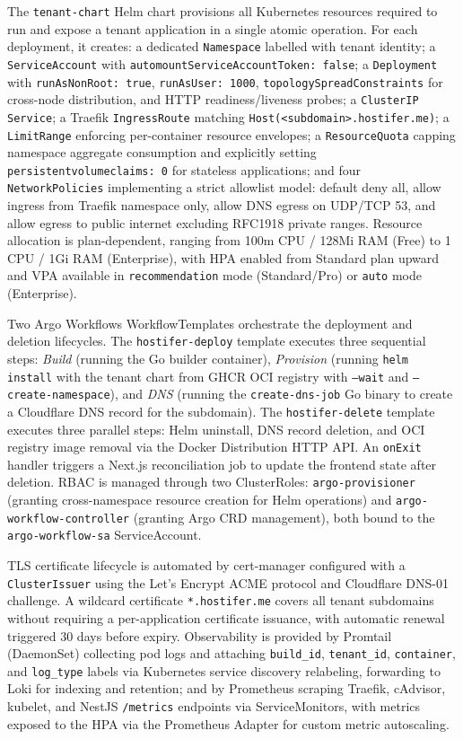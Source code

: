 The \texttt{tenant-chart} Helm chart provisions all Kubernetes resources required to run and expose a tenant application in a single atomic operation. For each deployment, it creates: a dedicated \texttt{Namespace} labelled with tenant identity; a \texttt{ServiceAccount} with \texttt{automountServiceAccountToken: false}; a \texttt{Deployment} with \texttt{runAsNonRoot: true}, \texttt{runAsUser: 1000}, \texttt{topologySpreadConstraints} for cross-node distribution, and HTTP readiness/liveness probes; a \texttt{ClusterIP Service}; a Traefik \texttt{IngressRoute} matching \texttt{Host(<subdomain>.hostifer.me)}; a \texttt{LimitRange} enforcing per-container resource envelopes; a \texttt{ResourceQuota} capping namespace aggregate consumption and explicitly setting \texttt{persistentvolumeclaims: 0} for stateless applications; and four \texttt{NetworkPolicies} implementing a strict allowlist model: default deny all, allow ingress from Traefik namespace only, allow DNS egress on UDP/TCP 53, and allow egress to public internet excluding RFC1918 private ranges. Resource allocation is plan-dependent, ranging from 100m CPU / 128Mi RAM (Free) to 1 CPU / 1Gi RAM (Enterprise), with HPA enabled from Standard plan upward and VPA available in \texttt{recommendation} mode (Standard/Pro) or \texttt{auto} mode (Enterprise).

Two Argo Workflows WorkflowTemplates orchestrate the deployment and deletion lifecycles. The \texttt{hostifer-deploy} template executes three sequential steps: \textit{Build} (running the Go builder container), \textit{Provision} (running \texttt{helm install} with the tenant chart from GHCR OCI registry with \texttt{--wait} and \texttt{--create-namespace}), and \textit{DNS} (running the \texttt{create-dns-job} Go binary to create a Cloudflare DNS record for the subdomain). The \texttt{hostifer-delete} template executes three parallel steps: Helm uninstall, DNS record deletion, and OCI registry image removal via the Docker Distribution HTTP API. An \texttt{onExit} handler triggers a Next.js reconciliation job to update the frontend state after deletion. RBAC is managed through two ClusterRoles: \texttt{argo-provisioner} (granting cross-namespace resource creation for Helm operations) and \texttt{argo-workflow-controller} (granting Argo CRD management), both bound to the \texttt{argo-workflow-sa} ServiceAccount.

TLS certificate lifecycle is automated by cert-manager configured with a \texttt{ClusterIssuer} using the Let's Encrypt ACME protocol and Cloudflare DNS-01 challenge. A wildcard certificate \texttt{*.hostifer.me} covers all tenant subdomains without requiring a per-application certificate issuance, with automatic renewal triggered 30 days before expiry. Observability is provided by Promtail (DaemonSet) collecting pod logs and attaching \texttt{build\_id}, \texttt{tenant\_id}, \texttt{container}, and \texttt{log\_type} labels via Kubernetes service discovery relabeling, forwarding to Loki for indexing and retention; and by Prometheus scraping Traefik, cAdvisor, kubelet, and NestJS \texttt{/metrics} endpoints via ServiceMonitors, with metrics exposed to the HPA via the Prometheus Adapter for custom metric autoscaling.

